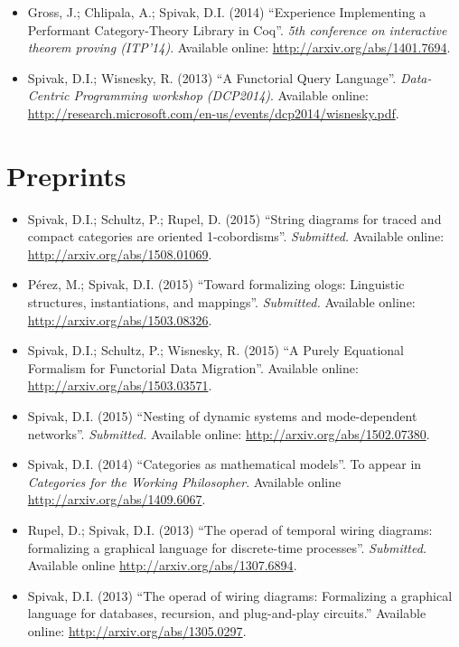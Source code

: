 \documentclass[11pt,oneside,article]{memoir}
\begin{document}
\begin{itemize}
\item Gross, J.; Chlipala, A.; Spivak, D.I. (2014) ``Experience Implementing a Performant Category-Theory Library in Coq''. \emph{5th conference on interactive theorem proving (ITP'14)}. Available online: \url{http://arxiv.org/abs/1401.7694}.

\item Spivak, D.I.; Wisnesky, R. (2013) ``A Functorial Query Language''. \emph{Data-Centric Programming workshop (DCP2014)}. Available online: \url{http://research.microsoft.com/en-us/events/dcp2014/wisnesky.pdf}.

\end{itemize}

\section*{Preprints}

\begin{itemize}

\item Spivak, D.I.; Schultz, P.; Rupel, D. (2015) ``String diagrams for traced and compact categories are oriented 1-cobordisms''. \emph{Submitted.} Available online: \url{http://arxiv.org/abs/1508.01069}.

\item P\'erez, M.; Spivak, D.I. (2015) ``Toward formalizing ologs: Linguistic structures, instantiations, and mappings''. \emph{Submitted.} Available online: \url{http://arxiv.org/abs/1503.08326}.

\item Spivak, D.I.; Schultz, P.; Wisnesky, R. (2015) ``A Purely Equational Formalism for Functorial Data Migration''. Available online: \url{http://arxiv.org/abs/1503.03571}.

\item Spivak, D.I. (2015) ``Nesting of dynamic systems and mode-dependent networks''. \emph{Submitted.} Available online: \url{http://arxiv.org/abs/1502.07380}.

\item Spivak, D.I. (2014) ``Categories as mathematical models''. To appear in \emph{Categories for the Working Philosopher}. Available online \url{http://arxiv.org/abs/1409.6067}.

\item Rupel, D.; Spivak, D.I. (2013) ``The operad of temporal wiring diagrams: formalizing a graphical language for discrete-time processes''. \emph{Submitted.} Available online \url{http://arxiv.org/abs/1307.6894}.

\item Spivak, D.I. (2013) ``The operad of wiring diagrams: Formalizing a graphical language for databases, recursion, and plug-and-play circuits.'' Available online: \url{http://arxiv.org/abs/1305.0297}.


\end{itemize}
\end{document}
